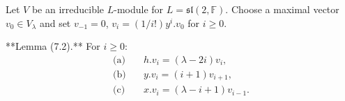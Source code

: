Let $V$ be an irreducible $L$-module for $L = \mathfrak{sl}(2, \mathbb{F})$. Choose a maximal vector $v_0 \in V_\lambda$ and set $v_{-1} = 0$, $v_i = (1/i!) y^i.v_0$ for $i \geq 0$.

**Lemma (7.2).** For $i \geq 0$:
\begin{align*}
\text{(a)} &\quad h.v_i = (\lambda - 2i)v_i, \\
\text{(b)} &\quad y.v_i = (i+1)v_{i+1}, \\
\text{(c)} &\quad x.v_i = (\lambda - i + 1)v_{i-1}.
\end{align*}
